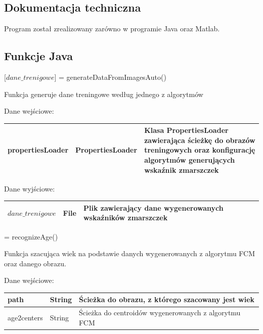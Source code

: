 \documentclass[a4paper,twoside,12pt]{book}
\begin{document}
    \begin{appendices}


        \chapter*{Dokumentacja techniczna}
        Program został zrealizowany zarówno w programie Java oraz Matlab.

        \section*{Funkcje Java}

        [$dane\_trenigowe$] = generateDataFromImagesAuto()

        \bigskip
        Funkcja generuje dane treningowe według jednego z algorytmów

        \bigskip
        Dane wejściowe:
        \begin{table}[h!]
            \centering
            \begin{tabular}{|p{4cm}|p{4cm}|p{4cm}|}
                \hline
                propertiesLoader & PropertiesLoader
                & Klasa PropertiesLoader zawierająca ścieżkę do obrazów
                treningowych oraz konfigurację algorytmów generujących wskaźnik zmarszczek \\ \hline
            \end{tabular}
        \end{table}

        Dane wyjściowe:
        \begin{table}[h!]
            \centering
            \begin{tabular}{|p{4cm}|p{4cm}|p{4cm}|}
                \hline
                $dane\_trenigowe$ & File & Plik zawierający dane wygenerowanych wskaźników zmarszczek\\ \hline
            \end{tabular}
        \end{table}

        \clearpage
        [$wiek$] = recognizeAge()

        \bigskip
        Funkcja szacująca wiek na podstawie danych wygenerowanych z algorytmu FCM oraz danego obrazu.
        \bigskip

        Dane wejściowe:
        \begin{table}[h!]
            \centering
            \begin{tabular}{|p{4cm}|p{4cm}|p{4cm}|}
                \hline
                \multicolumn{1}{|p{4cm}|}{path} & \multicolumn{1}{p{4cm}|}{String} & \multicolumn{1}{p{4cm}|}{Ścieżka do obrazu, z którego szacowany jest wiek} \\ \hline
                age2centers & String & Ścieżka do centroidów wygenerowanych z
                algorytmu FCM                      \\ \hline
            \end{tabular}
        \end{table}



\end{appendices}
\end{document}
